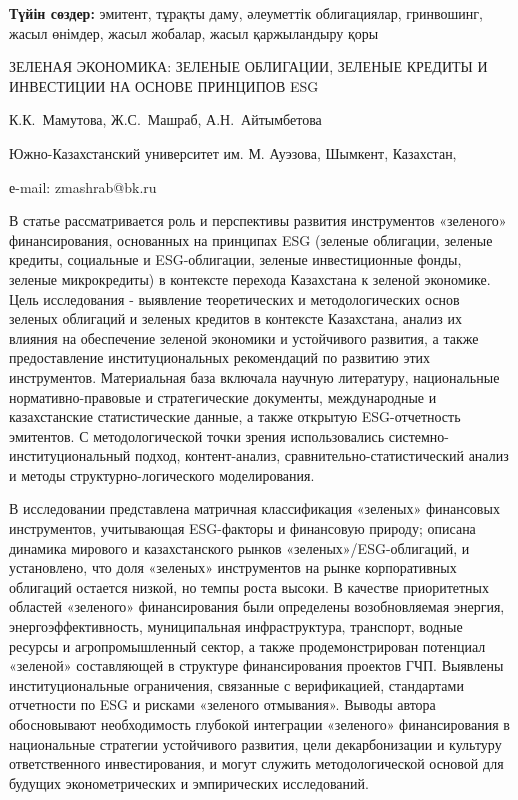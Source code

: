 {\bfseries Түйін сөздер:} эмитент, тұрақты даму, әлеуметтік облигациялар,
гринвошинг, жасыл өнімдер, жасыл жобалар, жасыл қаржыландыру қоры
\vspace{1em}
\begin{header}
ЗЕЛЕНАЯ ЭКОНОМИКА: ЗЕЛЕНЫЕ ОБЛИГАЦИИ, ЗЕЛЕНЫЕ КРЕДИТЫ И ИНВЕСТИЦИИ НА ОСНОВЕ ПРИНЦИПОВ ESG

К.К.~Мамутова,
Ж.С.~Машраб\envelope,
А.Н.~Айтымбетова
\end{header}

\begin{affil}
Южно-Казахстанский университет им. М. Ауэзова, Шымкент, Казахстан,

е-mail: zmashrab@bk.ru
\end{affil}

В статье рассматривается роль и перспективы развития инструментов
«зеленого» финансирования, основанных на принципах ESG (зеленые
облигации, зеленые кредиты, социальные и ESG-облигации, зеленые
инвестиционные фонды, зеленые микрокредиты) в контексте перехода
Казахстана к зеленой экономике. Цель исследования - выявление
теоретических и методологических основ зеленых облигаций и зеленых
кредитов в контексте Казахстана, анализ их влияния на обеспечение
зеленой экономики и устойчивого развития, а также предоставление
институциональных рекомендаций по развитию этих инструментов.
Материальная база включала научную литературу, национальные
нормативно-правовые и стратегические документы, международные и
казахстанские статистические данные, а также открытую ESG-отчетность
эмитентов. С методологической точки зрения использовались
системно-институциональный подход, контент-анализ,
сравнительно-статистический анализ и методы структурно-логического
моделирования.

В исследовании представлена матричная классификация «зеленых» финансовых
инструментов, учитывающая ESG-факторы и финансовую природу; описана
динамика мирового и казахстанского рынков «зеленых»/ESG-облигаций, и
установлено, что доля «зеленых» инструментов на рынке корпоративных
облигаций остается низкой, но темпы роста высоки. В качестве
приоритетных областей «зеленого» финансирования были определены
возобновляемая энергия, энергоэффективность, муниципальная
инфраструктура, транспорт, водные ресурсы и агропромышленный сектор, а
также продемонстрирован потенциал «зеленой» составляющей в структуре
финансирования проектов ГЧП. Выявлены институциональные ограничения,
связанные с верификацией, стандартами отчетности по ESG и рисками
«зеленого отмывания». Выводы автора обосновывают необходимость глубокой
интеграции «зеленого» финансирования в национальные стратегии
устойчивого развития, цели декарбонизации и культуру ответственного
инвестирования, и могут служить методологической основой для будущих
эконометрических и эмпирических исследований.

